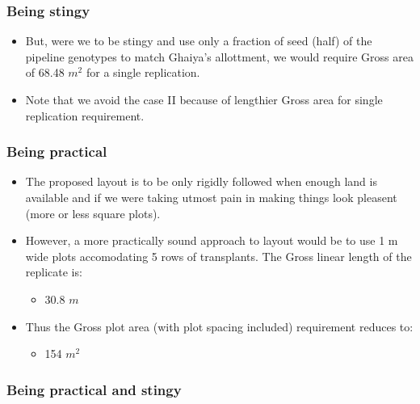 \documentclass[12pt,]{article}
\providecommand{\tightlist}{%
  \setlength{\itemsep}{0pt}\setlength{\parskip}{0pt}}
\begin{document}
\hypertarget{being-stingy}{%
\subsubsection{Being stingy}\label{being-stingy}}

\begin{itemize}
\tightlist
\item
  But, were we to be stingy and use only a fraction of seed (half) of the pipeline genotypes to match Ghaiya's allottment, we would require Gross area of 68.48 \(m^2\) for a single replication.
\item
  Note that we avoid the case II because of lengthier Gross area for single replication requirement.
\end{itemize}

\hypertarget{being-practical}{%
\subsubsection{Being practical}\label{being-practical}}

\begin{itemize}
\tightlist
\item
  The proposed layout is to be only rigidly followed when enough land is available and if we were taking utmost pain in making things look pleasent (more or less square plots).
\item
  However, a more practically sound approach to layout would be to use 1 m wide plots accomodating 5 rows of transplants. The Gross linear length of the replicate is:

  \begin{itemize}
  \tightlist
  \item
    30.8 \(m\)
  \end{itemize}
\item
  Thus the Gross plot area (with plot spacing included) requirement reduces to:

  \begin{itemize}
  \tightlist
  \item
    154 \(m^2\)
  \end{itemize}
\end{itemize}

\hypertarget{being-practical-and-stingy}{%
\subsubsection{Being practical and stingy}\label{being-practical-and-stingy}}
\end{document}
